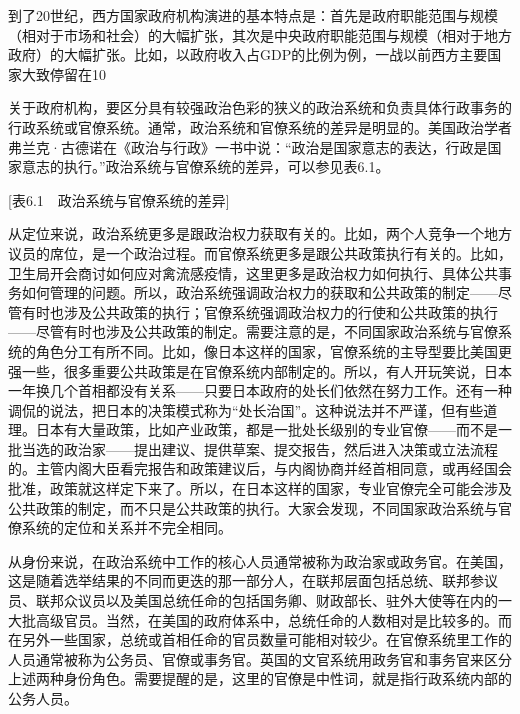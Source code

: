 到了20世纪，西方国家政府机构演进的基本特点是：首先是政府职能范围与规模（相对于市场和社会）的大幅扩张，其次是中央政府职能范围与规模（相对于地方政府）的大幅扩张。比如，以政府收入占GDP的比例为例，一战以前西方主要国家大致停留在10%


关于政府机构，要区分具有较强政治色彩的狭义的政治系统和负责具体行政事务的行政系统或官僚系统。通常，政治系统和官僚系统的差异是明显的。美国政治学者弗兰克·古德诺在《政治与行政》一书中说：“政治是国家意志的表达，行政是国家意志的执行。”政治系统与官僚系统的差异，可以参见表6.1。

[表6.1　政治系统与官僚系统的差异]

从定位来说，政治系统更多是跟政治权力获取有关的。比如，两个人竞争一个地方议员的席位，是一个政治过程。而官僚系统更多是跟公共政策执行有关的。比如，卫生局开会商讨如何应对禽流感疫情，这里更多是政治权力如何执行、具体公共事务如何管理的问题。所以，政治系统强调政治权力的获取和公共政策的制定——尽管有时也涉及公共政策的执行；官僚系统强调政治权力的行使和公共政策的执行——尽管有时也涉及公共政策的制定。需要注意的是，不同国家政治系统与官僚系统的角色分工有所不同。比如，像日本这样的国家，官僚系统的主导型要比美国更强一些，很多重要公共政策是在官僚系统内部制定的。所以，有人开玩笑说，日本一年换几个首相都没有关系——只要日本政府的处长们依然在努力工作。还有一种调侃的说法，把日本的决策模式称为“处长治国”。这种说法并不严谨，但有些道理。日本有大量政策，比如产业政策，都是一批处长级别的专业官僚——而不是一批当选的政治家——提出建议、提供草案、提交报告，然后进入决策或立法流程的。主管内阁大臣看完报告和政策建议后，与内阁协商并经首相同意，或再经国会批准，政策就这样定下来了。所以，在日本这样的国家，专业官僚完全可能会涉及公共政策的制定，而不只是公共政策的执行。大家会发现，不同国家政治系统与官僚系统的定位和关系并不完全相同。

从身份来说，在政治系统中工作的核心人员通常被称为政治家或政务官。在美国，这是随着选举结果的不同而更迭的那一部分人，在联邦层面包括总统、联邦参议员、联邦众议员以及美国总统任命的包括国务卿、财政部长、驻外大使等在内的一大批高级官员。当然，在美国的政府体系中，总统任命的人数相对是比较多的。而在另外一些国家，总统或首相任命的官员数量可能相对较少。在官僚系统里工作的人员通常被称为公务员、官僚或事务官。英国的文官系统用政务官和事务官来区分上述两种身份角色。需要提醒的是，这里的官僚是中性词，就是指行政系统内部的公务人员。

